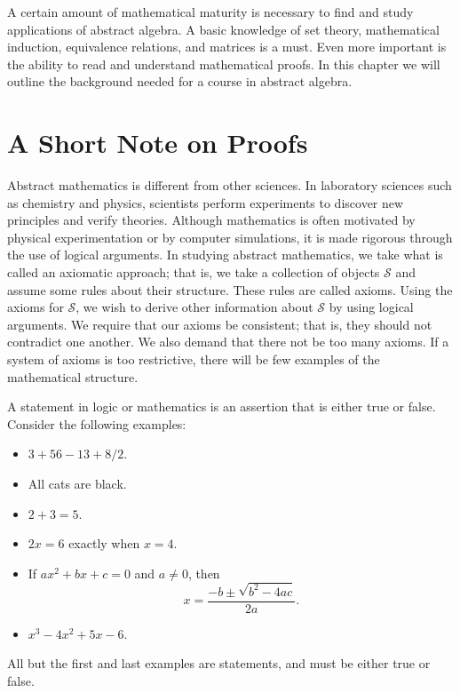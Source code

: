  
A certain amount of mathematical maturity is necessary to find and study applications of abstract algebra.  A basic knowledge of set theory, mathematical induction, equivalence relations, and matrices is a must.  Even more important is the ability to read and understand mathematical proofs.  In this chapter we will outline the background needed for a course in abstract algebra. 
 

\section{A Short Note on Proofs}\label{sets_a_short_note}
 
Abstract mathematics is different from other sciences. In laboratory sciences such as chemistry and physics, scientists perform experiments to discover new principles and verify theories.  Although mathematics is often motivated by physical experimentation or by computer simulations, it is made rigorous through the use of logical arguments.  In studying abstract mathematics, we take what is called an  axiomatic approach; that is, we take a collection of objects $\mathcal S$ and assume some rules about their structure.  These rules are called {\bfi axioms}.  Using the axioms for $\mathcal S$, we wish to derive other information about $\mathcal S$ by using logical arguments.  We require that our axioms be consistent; that is, they should not contradict one another.  We also demand that there not be too many axioms.  If a system of axioms is too restrictive,  there will be few examples of the mathematical structure.  

A {\bfi statement\/} in logic or mathematics is an assertion that is either true or false.  Consider the following examples:
\begin{itemize}
 
\item
$3 + 56 - 13 + 8/2 $.
 
\item
All cats are black.
 
\item
$2 + 3 = 5$.
 
\item
$2x = 6$ exactly when $x = 4$.
 
\item
If $ax^2 + bx + c = 0$ and $a \neq 0$, then
$$
x = \frac{-b \pm \sqrt{b^2 - 4ac}}{2a}.
$$
 
\item
$x^3 - 4x^2 + 5 x - 6$.
 
\end{itemize}
All but the first  and last examples are statements, and must be either true or false.  
 
